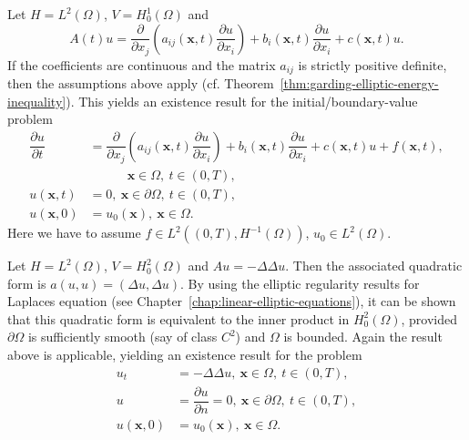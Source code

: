 \begin{Example}
\label{ex:parabolic-divergence-dirichlet-problem}
Let $H=L^2(\Omega)$, $V=H_0^1(\Omega)$ and
\begin{equation}\label{eq:parabolic-dirichlet-spatial-divergence-operator}
A(t)u=\dfrac{\partial}{\partial x_j}\left(a_{ij}(\bm{x},t)\dfrac{\partial u}{\partial x_i}\right)+b_i(\bm{x},t)\dfrac{\partial u}{\partial x_i}+c(\bm{x},t)u.
\end{equation}
If the coefficients are continuous and the matrix $a_{ij}$ is strictly positive definite, then the assumptions above apply (cf. Theorem~\ref{thm:garding-elliptic-energy-inequality}). This yields an existence result for the initial/boundary-value problem
\begin{equation}\label{eq:parabolic-dirichlet-initial-boundary-value-problem}
\begin{aligned}
\dfrac{\partial u}{\partial t}&=\dfrac{\partial}{\partial x_j}\left(a_{ij}(\bm{x},t)\dfrac{\partial u}{\partial x_i}\right)+b_i(\bm{x},t)\dfrac{\partial u}{\partial x_i}+c(\bm{x},t)u+f(\bm{x},t),\\
&\hspace{3em}\bm{x}\in\Omega,\ t\in(0,T),\\
u(\bm{x},t)&=0,\ \bm{x}\in\partial\Omega,\ t\in(0,T),\\
u(\bm{x},0)&=u_0(\bm{x}),\ \bm{x}\in\Omega.
\end{aligned}
\end{equation}
Here we have to assume $f\in L^2((0,T),H^{-1}(\Omega))$, $u_0\in L^2(\Omega)$.
\end{Example}

\begin{Example}
\label{ex:biharmonic-parabolic-clamped-problem}
Let $H=L^2(\Omega)$, $V=H_0^2(\Omega)$ and $Au=-\Delta\Delta u$. Then the associated quadratic form is $a(u,u)=(\Delta u,\Delta u)$. By using the elliptic regularity results for Laplace\textquotesingle s equation (see Chapter~\ref{chap:linear-elliptic-equations}), it can be shown that this quadratic form is equivalent to the inner product in $H_0^2(\Omega)$, provided $\partial\Omega$ is sufficiently smooth (say of class $C^2$) and $\Omega$ is bounded. Again the result above is applicable, yielding an existence result for the problem
\begin{equation}\label{eq:biharmonic-parabolic-clamped-initial-boundary-problem}
\begin{aligned}u_t&=-\Delta\Delta u,\ \bm{x}\in\Omega,\ t\in(0,T),\\u&=\dfrac{\partial u}{\partial n}=0,\ \bm{x}\in\partial\Omega,\ t\in(0,T),\\u(\bm{x},0)&=u_0(\bm{x}),\ \bm{x}\in\Omega.\end{aligned}
\end{equation}

\end{Example}

